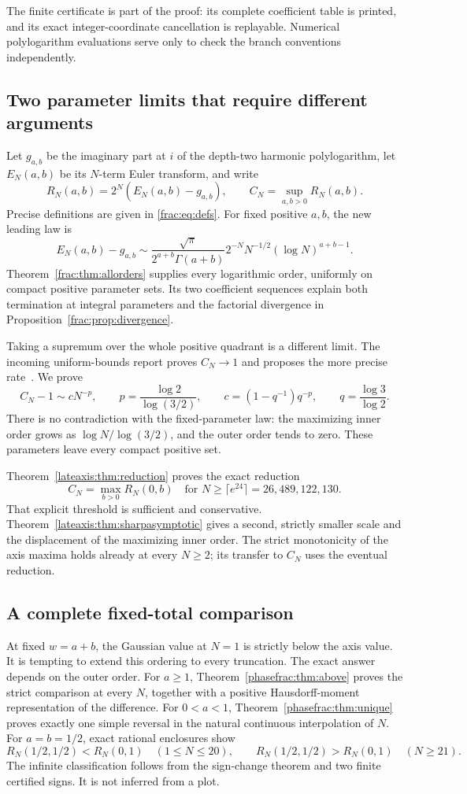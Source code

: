The finite certificate is part of the proof: its complete coefficient
table is printed, and its exact integer-coordinate cancellation is
replayable. Numerical polylogarithm evaluations serve only to check
the branch conventions independently.

\subsection{Two parameter limits that require different arguments}

Let $g_{a,b}$ be the imaginary part at $i$ of the depth-two harmonic
polylogarithm, let $E_N(a,b)$ be its $N$-term Euler transform, and write
\[
 R_N(a,b)=2^N(E_N(a,b)-g_{a,b}),\qquad
 C_N=\sup_{a,b>0}R_N(a,b).
\]
Precise definitions are given in \eqref{frac:eq:defs}. For fixed
positive $a,b$, the new leading law is
\[
 E_N(a,b)-g_{a,b}\sim
 \frac{\sqrt\pi}{2^{a+b}\Gamma(a+b)}
 2^{-N}N^{-1/2}(\log N)^{a+b-1}.
\]
Theorem~\ref{frac:thm:allorders} supplies every logarithmic order,
uniformly on compact positive parameter sets. Its two coefficient
sequences explain both termination at integral parameters and the
factorial divergence in Proposition~\ref{frac:prop:divergence}.

Taking a supremum over the whole positive quadrant is a different
limit. The incoming uniform-bounds report proves $C_N\to1$ and proposes
the more precise rate~\cite{incoming-bounds}. We prove
\[
 C_N-1\sim cN^{-p},\qquad
 p=\frac{\log2}{\log(3/2)},\qquad
 c=(1-q^{-1})q^{-p},\qquad q=\frac{\log3}{\log2}.
\]
There is no contradiction with the fixed-parameter law: the maximizing
inner order grows as $\log N/\log(3/2)$, and the outer order tends to
zero. These parameters leave every compact positive set.

Theorem~\ref{lateaxis:thm:reduction} proves the exact reduction
\[
 C_N=\max_{b>0}R_N(0,b)
 \quad\text{for }N\ge\lceil e^{24}\rceil=26{,}489{,}122{,}130.
\]
That explicit threshold is sufficient and conservative.
Theorem~\ref{lateaxis:thm:sharpasymptotic} gives a second, strictly
smaller scale and the displacement of the maximizing inner order.
The strict monotonicity of the axis maxima holds already at every
$N\ge2$; its transfer to $C_N$ uses the eventual reduction.

\subsection{A complete fixed-total comparison}

At fixed $w=a+b$, the Gaussian value at $N=1$ is strictly below the
axis value. It is tempting to extend this ordering to every
truncation. The exact answer depends on the outer order.
For $a\ge1$, Theorem~\ref{phasefrac:thm:above} proves the strict
comparison at every $N$, together with a positive Hausdorff-moment
representation of the difference.
For $0<a<1$, Theorem~\ref{phasefrac:thm:unique} proves exactly one
simple reversal in the natural continuous interpolation of $N$.
For $a=b=1/2$, exact rational enclosures show
\[
 R_N(1/2,1/2)<R_N(0,1)\quad(1\le N\le20),\qquad
 R_N(1/2,1/2)>R_N(0,1)\quad(N\ge21).
\]
The infinite classification follows from the sign-change theorem
and two finite certified signs. It is not inferred from a plot.


